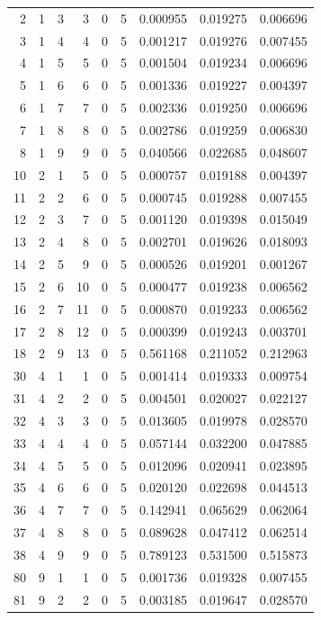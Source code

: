 \begin{longtable}{rrrrrrrrr}
2 & 1 & 3 & 3 & 0 & 5 & 0.000955 & 0.019275 & 0.006696 \\
3 & 1 & 4 & 4 & 0 & 5 & 0.001217 & 0.019276 & 0.007455 \\
4 & 1 & 5 & 5 & 0 & 5 & 0.001504 & 0.019234 & 0.006696 \\
5 & 1 & 6 & 6 & 0 & 5 & 0.001336 & 0.019227 & 0.004397 \\
6 & 1 & 7 & 7 & 0 & 5 & 0.002336 & 0.019250 & 0.006696 \\
7 & 1 & 8 & 8 & 0 & 5 & 0.002786 & 0.019259 & 0.006830 \\
8 & 1 & 9 & 9 & 0 & 5 & 0.040566 & 0.022685 & 0.048607 \\
10 & 2 & 1 & 5 & 0 & 5 & 0.000757 & 0.019188 & 0.004397 \\
11 & 2 & 2 & 6 & 0 & 5 & 0.000745 & 0.019288 & 0.007455 \\
12 & 2 & 3 & 7 & 0 & 5 & 0.001120 & 0.019398 & 0.015049 \\
13 & 2 & 4 & 8 & 0 & 5 & 0.002701 & 0.019626 & 0.018093 \\
14 & 2 & 5 & 9 & 0 & 5 & 0.000526 & 0.019201 & 0.001267 \\
15 & 2 & 6 & 10 & 0 & 5 & 0.000477 & 0.019238 & 0.006562 \\
16 & 2 & 7 & 11 & 0 & 5 & 0.000870 & 0.019233 & 0.006562 \\
17 & 2 & 8 & 12 & 0 & 5 & 0.000399 & 0.019243 & 0.003701 \\
18 & 2 & 9 & 13 & 0 & 5 & 0.561168 & 0.211052 & 0.212963 \\
30 & 4 & 1 & 1 & 0 & 5 & 0.001414 & 0.019333 & 0.009754 \\
31 & 4 & 2 & 2 & 0 & 5 & 0.004501 & 0.020027 & 0.022127 \\
32 & 4 & 3 & 3 & 0 & 5 & 0.013605 & 0.019978 & 0.028570 \\
33 & 4 & 4 & 4 & 0 & 5 & 0.057144 & 0.032200 & 0.047885 \\
34 & 4 & 5 & 5 & 0 & 5 & 0.012096 & 0.020941 & 0.023895 \\
35 & 4 & 6 & 6 & 0 & 5 & 0.020120 & 0.022698 & 0.044513 \\
36 & 4 & 7 & 7 & 0 & 5 & 0.142941 & 0.065629 & 0.062064 \\
37 & 4 & 8 & 8 & 0 & 5 & 0.089628 & 0.047412 & 0.062514 \\
38 & 4 & 9 & 9 & 0 & 5 & 0.789123 & 0.531500 & 0.515873 \\
80 & 9 & 1 & 1 & 0 & 5 & 0.001736 & 0.019328 & 0.007455 \\
81 & 9 & 2 & 2 & 0 & 5 & 0.003185 & 0.019647 & 0.028570 \\

\end{longtable}
